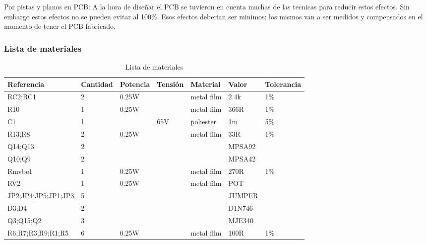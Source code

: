 \documentclass[a4paper,12pt,twoside]{article}
\begin{document}
Por pistas y planos en PCB:
\newline
\newline
A la hora de diseñar el PCB se tuvieron en cuenta muchas de las tecnicas para reducir estos efectos. Sin embargo estos efectos no se pueden evitar al 100\%. Esos efectos deberian ser minimos; los mismos van a ser medidos y compensados en el momento de tener el PCB fabricado.

\newpage

\subsubsection{Lista de materiales}

\begin{table}[h!]
\centering
\caption{Lista de materiales}
\label{label}
\begin{tabular}{@{}lllllll@{}}
\toprule
Referencia            & Cantidad & Potencia  & Tensión   &  Material  & Valor    & Tolerancia \\ \midrule
RC2;RC1               & 2        &  0.25W    &           &  metal film& 2.4k     & 1\% \\
R10                   & 1        &  0.25W    &           &  metal film& 366R     & 1\% \\
C1                    & 1        &           & 65V       &  poliester & 1m       & 5\% \\
R13;R8                & 2        &  0.25W    &           &  metal film& 33R      & 1\% \\
Q14;Q13               & 2        &           &           &            & MPSA92   &     \\
Q10;Q9                & 2        &           &           &            & MPSA42   &     \\
Rmvbe1                & 1        &  0.25W    &           &  metal film& 270R     & 1\% \\
RV2                   & 1        &  0.25W    &           &  metal film& POT      &     \\
JP2;JP4;JP5;JP1;JP3   & 5        &           &           &            & JUMPER   &     \\
D3;D4                 & 2        &           &           &            & D1N746   &     \\
Q3;Q15;Q2             & 3        &           &           &            & MJE340   &     \\
R6;R7;R3;R9;R1;R5     & 6        &  0.25W    &           &  metal film& 100R     & 1\% \\

\end{tabular}
\end{table}
\end{document}
